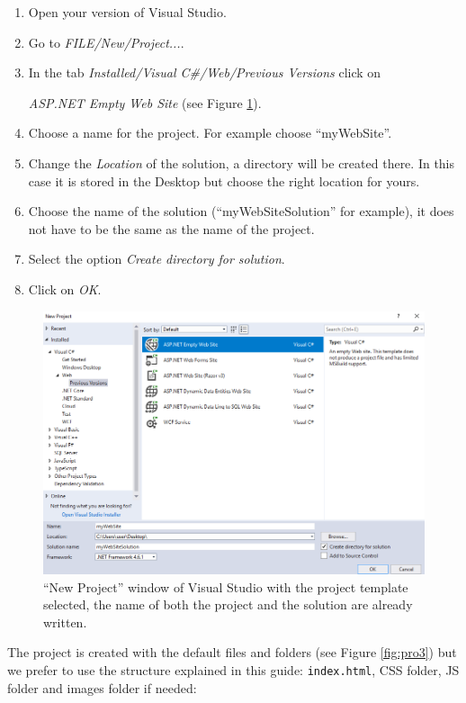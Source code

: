 \begin{enumerate}
    \item Open your version of Visual Studio.
    \item Go to \textit{FILE/New/Project...}.
    \item In the tab \textit{Installed/Visual C\#/Web/Previous Versions} click on 
    
    \textit{ASP.NET Empty Web Site} (see Figure \ref{fig:pro2}).
    
    \item Choose a name for the project. For example choose ``myWebSite''.
    \item Change the \textit{Location} of the solution, a directory will be created there. In this case it is stored in the Desktop but choose the right location for yours.
    \item Choose the name of the solution (``myWebSiteSolution'' for example), it does not have to be the same as the name of the project. 
    \item Select the option \textit{Create directory for solution}.
    \item Click on \textit{OK}.
\end{enumerate}

\begin{figure}
    \centering
    \includegraphics[width= 0.9 \textwidth]{Figures/Projects/pro2}
    \caption{``New Project'' window of Visual Studio with the project template selected, the name of both the project and the solution are already written.}
    \label{fig:pro2}
\end{figure}

The project is created with the default files and folders (see Figure \ref{fig:pro3}) but we prefer to use the structure explained in this guide: \texttt{index.html}, CSS folder, JS folder and images folder if needed:

